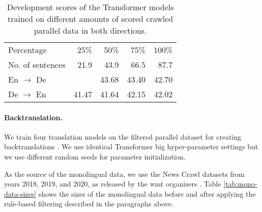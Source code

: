 \begin{table}
  \centering
  \begin{tabular}{lrrrr}
    \toprule
    Percentage & 25\% & 50\% & 75\% & 100\% \\
    No. of sentences & 21.9  & 43.9 & 66.5 & 87.7 \\
    \midrule
    En $\rightarrow$ De &  & 43.68 & 43.40 & 42.70 \\
    De $\rightarrow$ En & 41.47 & 41.64 & 42.15 & 42.02 \\
    \bottomrule
  \end{tabular}
  \caption{Development scores of the Transformer models trained on different
    amounts of scored crawled parallel data in both directions.}%
  \label{tab:dual-cross-entropy-selection}
\end{table}


\paragraph{Backtranslation.} We train four translation models on the filtered
parallel dataset for creating backtranslations
\citep{sennrich-etal-2016-improving}. We use identical Transformer big
hyper-parameter settings but we use different random seeds for parameter
initialization. 

As the source of the monolingual data, we use the News Crawl datasets from
years 2018, 2019, and 2020, as released by the \acs{wmt} organizers
\citep{bojar-etal-2018-findings,barrault-etal-2019-findings,barrault-etal-2020-findings}. Table
\ref{tab:mono-data-sizes} shows the sizes of the monolingual data before and
after applying the rule-based filtering described in the paragraphs above.


